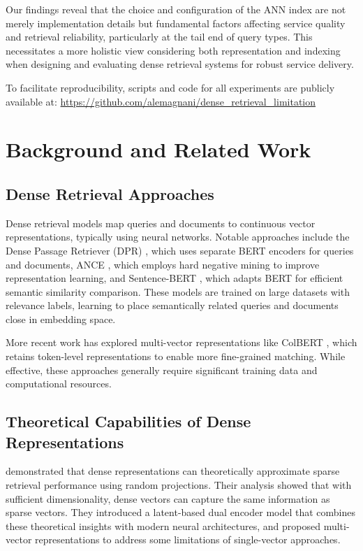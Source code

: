 \documentclass[manuscript]{acmart}
\begin{document}
Our findings reveal that the choice and configuration of the ANN index are not merely implementation details but fundamental factors affecting service quality and retrieval reliability, particularly at the tail end of query types. This necessitates a more holistic view considering both representation and indexing when designing and evaluating dense retrieval systems for robust service delivery.

To facilitate reproducibility, scripts and code for all experiments are publicly available at: \url{https://github.com/alemagnani/dense_retrieval_limitation}





\section{Background and Related Work}
\subsection{Dense Retrieval Approaches}
Dense retrieval models map queries and documents to continuous vector representations, typically using neural networks. Notable approaches include the Dense Passage Retriever (DPR) \cite{karpukhin2020dense}, which uses separate BERT encoders for queries and documents, ANCE \cite{xiong2021approximate}, which employs hard negative mining to improve representation learning, and Sentence-BERT \cite{reimers2019sentencebert}, which adapts BERT for efficient semantic similarity comparison. These models are trained on large datasets with relevance labels, learning to place semantically related queries and documents close in embedding space.

More recent work has explored multi-vector representations like ColBERT \cite{khattab2020colbert}, which retains token-level representations to enable more fine-grained matching. While effective, these approaches generally require significant training data and computational resources.

\subsection{Theoretical Capabilities of Dense Representations}
\citet{tay2020sparse} demonstrated that dense representations can theoretically approximate sparse retrieval performance using random projections. Their analysis showed that with sufficient dimensionality, dense vectors can capture the same information as sparse vectors. They introduced a latent-based dual encoder model that combines these theoretical insights with modern neural architectures, and proposed multi-vector representations to address some limitations of single-vector approaches.
\end{document}
